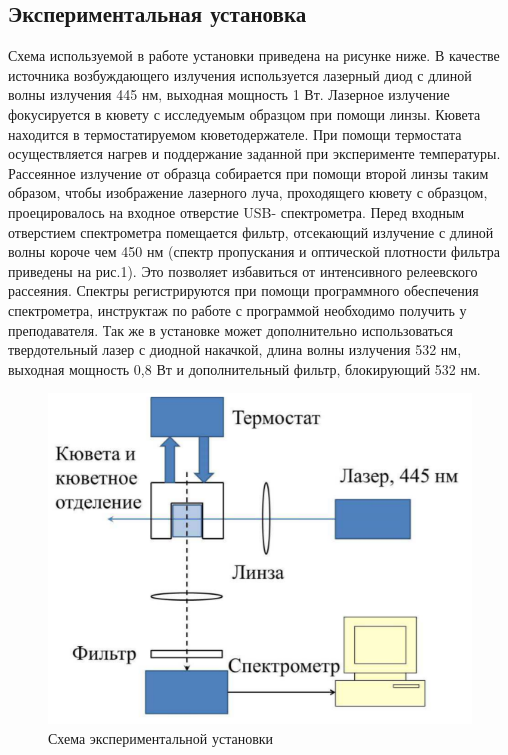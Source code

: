 \documentclass[a4paper,12pt]{article} %
\begin{document}
\subsection{Экспериментальная установка}
Схема используемой в работе установки приведена на рисунке ниже. В качестве
источника возбуждающего излучения используется лазерный диод с длиной волны
излучения  445 нм‚ выходная мощность 1 Вт. Лазерное излучение фокусируется в кювету с
исследуемым образцом при помощи линзы. Кювета находится в термостатируемом
кюветодержателе. При помощи термостата осуществляется нагрев и поддержание
заданной при эксперименте температуры. Рассеянное излучение от образца
собирается при помощи второй линзы таким образом, чтобы изображение лазерного луча,
проходящего кювету с образцом, проецировалось на входное отверстие USB-
спектрометра. Перед входным отверстием спектрометра помещается фильтр, отсекающий
излучение с длиной волны короче чем 450 нм (спектр пропускания и оптической
плотности фильтра приведены на рис.1). Это позволяет избавиться от интенсивного
релеевского рассеяния. Спектры регистрируются при помощи программного обеспечения
спектрометра, инструктаж по работе с программой необходимо получить у преподавателя.
Так же в установке может дополнительно использоваться твердотельный лазер с диодной
накачкой, длина волны излучения 532 нм, выходная мощность 0,8 Вт и дополнительный
фильтр, блокирующий 532 нм.
\begin{figure}[h!]
    \centering
    \includegraphics[scale=1]{ustanovka.png}
    \caption{Схема экспериментальной установки}
    \label{Ber}
\end{figure}
\end{document}
